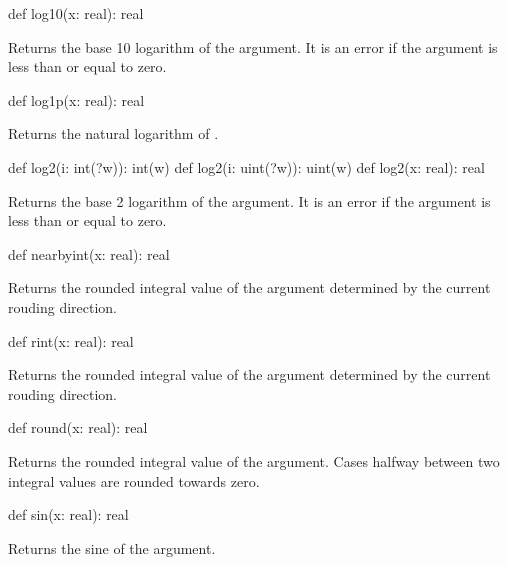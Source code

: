 \begin{protohead}
def log10(x: real): real
\end{protohead}
\begin{protobody}
Returns the base 10 logarithm of the argument.  It is an error if the
argument is less than or equal to zero.
\end{protobody}

\begin{protohead}
def log1p(x: real): real
\end{protohead}
\begin{protobody}
Returns the natural logarithm of .
\end{protobody}

\begin{protohead}
def log2(i: int(?w)): int(w)
def log2(i: uint(?w)): uint(w)
def log2(x: real): real
\end{protohead}
\begin{protobody}
Returns the base 2 logarithm of the argument.  It is an error if the
argument is less than or equal to zero.
\end{protobody}

\begin{protohead}
def nearbyint(x: real): real
\end{protohead}
\begin{protobody}
Returns the rounded integral value of the argument determined by the
current rouding direction.
\end{protobody}

\begin{protohead}
def rint(x: real): real
\end{protohead}
\begin{protobody}
Returns the rounded integral value of the argument determined by the
current rouding direction.
\end{protobody}

\begin{protohead}
def round(x: real): real
\end{protohead}
\begin{protobody}
Returns the rounded integral value of the argument.  Cases halfway
between two integral values are rounded towards zero.
\end{protobody}

\begin{protohead}
def sin(x: real): real
\end{protohead}
\begin{protobody}
Returns the sine of the argument.
\end{protobody}

